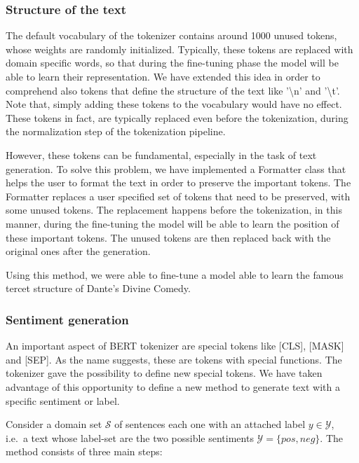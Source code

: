 \documentclass[10pt,twocolumn,letterpaper]{article}
\begin{document}
\subsubsection{Structure of the text}
\label{section:structureText}
The default vocabulary of the tokenizer contains around 1000 unused tokens, whose weights are randomly initialized.
Typically, these tokens are replaced with domain specific words, so that during the fine-tuning phase
the model will be able to learn their representation.
We have extended this idea in order to comprehend also tokens that define the structure of the text like
'\textbackslash n' and '\textbackslash t'.
Note that, simply adding these tokens to the vocabulary would have no effect.
These tokens in fact, are typically replaced even before the tokenization, during the normalization step of the tokenization pipeline.

However, these tokens can be fundamental, especially in the task of text generation.
To solve this problem, we have implemented a Formatter class that helps the user to format the text in order
to preserve the important tokens.
The Formatter replaces a user specified set of tokens that need to be preserved, with some unused tokens.
The replacement happens before the tokenization, in this manner, during the fine-tuning the model will be able to learn
the position of these important tokens.
The unused tokens are then replaced back with the original ones after the generation.

Using this method, we were able to fine-tune a model able to learn the famous tercet structure of Dante's Divine Comedy.

\subsubsection{Sentiment generation}
\label{sentiment}
An important aspect of BERT tokenizer are special tokens like [CLS], [MASK] and [SEP].
As the name suggests, these are tokens with special functions.
The tokenizer gave the possibility to define new special tokens.
We have taken advantage of this opportunity to define a new method to generate text with a specific sentiment or label.

Consider a domain set $\mathcal S$ of sentences each one with an attached label $y\in \mathcal Y$,
i.e.\ a text whose label-set are the two possible sentiments $\mathcal Y =\{pos, neg\}$.
The method consists of three main steps:
\end{document}
